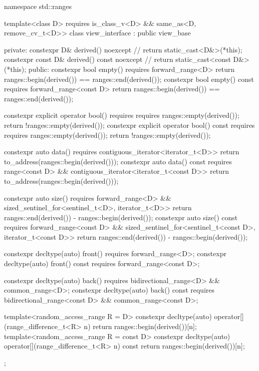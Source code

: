 %
\begin{codeblock}
namespace std::ranges {
  template<class D>
    requires is_class_v<D> && same_as<D, remove_cv_t<D>>
  class view_interface : public view_base {
  private:
    constexpr D& derived() noexcept {                   // \expos
      return static_cast<D&>(*this);
    }
    constexpr const D& derived() const noexcept {       // \expos
      return static_cast<const D&>(*this);
    }
  public:
    constexpr bool empty() requires forward_range<D> {
      return ranges::begin(derived()) == ranges::end(derived());
    }
    constexpr bool empty() const requires forward_range<const D> {
      return ranges::begin(derived()) == ranges::end(derived());
    }

    constexpr explicit operator bool()
      requires requires { ranges::empty(derived()); } {
        return !ranges::empty(derived());
      }
    constexpr explicit operator bool() const
      requires requires { ranges::empty(derived()); } {
        return !ranges::empty(derived());
      }

    constexpr auto data() requires contiguous_iterator<iterator_t<D>> {
      return to_address(ranges::begin(derived()));
    }
    constexpr auto data() const
      requires range<const D> && contiguous_iterator<iterator_t<const D>> {
        return to_address(ranges::begin(derived()));
      }

    constexpr auto size() requires forward_range<D> &&
      sized_sentinel_for<sentinel_t<D>, iterator_t<D>> {
        return ranges::end(derived()) - ranges::begin(derived());
      }
    constexpr auto size() const requires forward_range<const D> &&
      sized_sentinel_for<sentinel_t<const D>, iterator_t<const D>> {
        return ranges::end(derived()) - ranges::begin(derived());
      }

    constexpr decltype(auto) front() requires forward_range<D>;
    constexpr decltype(auto) front() const requires forward_range<const D>;

    constexpr decltype(auto) back() requires bidirectional_range<D> && common_range<D>;
    constexpr decltype(auto) back() const
      requires bidirectional_range<const D> && common_range<const D>;

    template<random_access_range R = D>
      constexpr decltype(auto) operator[](range_difference_t<R> n) {
        return ranges::begin(derived())[n];
      }
    template<random_access_range R = const D>
      constexpr decltype(auto) operator[](range_difference_t<R> n) const {
        return ranges::begin(derived())[n];
      }
  };
}
\end{codeblock}

